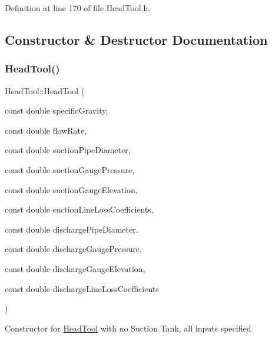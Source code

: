 Definition at line 170 of file Head\+Tool.\+h.



\subsection{Constructor \& Destructor Documentation}
\mbox{\label{class_head_tool_a9934c87c8f8eb515ff32e46c74004c0e}} 
\subsubsection{\texorpdfstring{Head\+Tool()}{HeadTool()}\hspace{0.1cm}{\footnotesize\ttfamily [1/3]}}
{\footnotesize\ttfamily Head\+Tool\+::\+Head\+Tool (\begin{DoxyParamCaption}\item[{const double}]{specific\+Gravity,  }\item[{const double}]{flow\+Rate,  }\item[{const double}]{suction\+Pipe\+Diameter,  }\item[{const double}]{suction\+Gauge\+Pressure,  }\item[{const double}]{suction\+Gauge\+Elevation,  }\item[{const double}]{suction\+Line\+Loss\+Coefficients,  }\item[{const double}]{discharge\+Pipe\+Diameter,  }\item[{const double}]{discharge\+Gauge\+Pressure,  }\item[{const double}]{discharge\+Gauge\+Elevation,  }\item[{const double}]{discharge\+Line\+Loss\+Coefficients }\end{DoxyParamCaption})\hspace{0.3cm}{\ttfamily [inline]}}

Constructor for \hyperlink{class_head_tool}{Head\+Tool} with no Suction Tank, all inputs specified


